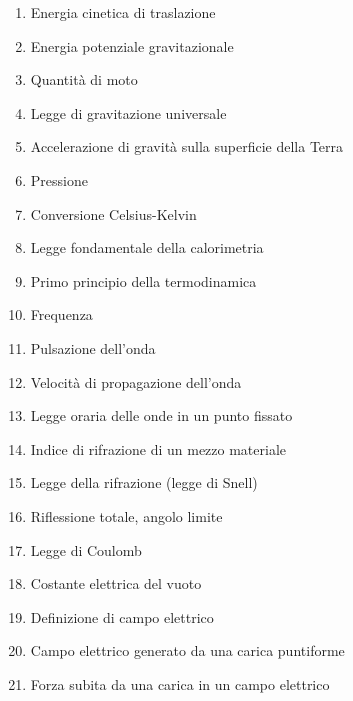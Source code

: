 \documentclass[a4paper,11pt,italian]{article}
\begin{document}
\begin{enumerate}
\item Energia cinetica di traslazione
\item Energia potenziale gravitazionale
\item Quantità di moto
\item Legge di gravitazione universale
\item Accelerazione di gravità sulla superficie della Terra 
\item Pressione 
\item Conversione Celsius-Kelvin
\item Legge fondamentale della calorimetria
\item Primo principio della termodinamica
\item Frequenza 
\item Pulsazione dell'onda
\item Velocità di propagazione dell'onda
\item Legge oraria delle onde in un punto fissato 
\item Indice di rifrazione di un mezzo materiale
\item Legge della rifrazione (legge di Snell)
\item Riflessione totale, angolo limite
\item Legge di Coulomb
\item Costante elettrica del vuoto 
\item Definizione di campo elettrico
\item Campo elettrico generato da una carica puntiforme
\item Forza subita da una carica in un campo elettrico
\end{enumerate}

\end{document}
